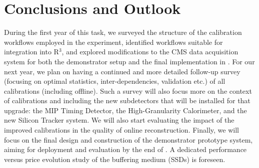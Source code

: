 \chapter{Conclusions and Outlook} \label{sec:conclusions_and_outlook}

During the first year of this task, 
we surveyed the structure of the calibration workflows employed in the experiment, 
identified workflows suitable for integration into R$^3$, 
and explored modifications to the CMS data acquisition system for both the demonstrator setup and the final implementation in \Phasetwo.
For our next year, we plan on having a continued and more detailed follow-up survey (focusing on optimal statistics, inter-dependencies, validation etc.) of all calibrations (including offline). Such a survey will also focus more on the context of \Phasetwo calibrations and including the new subdetectors that will be installed for that upgrade: 
the MIP Timing Detector,
the High-Granularity Calorimeter,
and the new Silicon Tracker system.
We will also start evaluating the impact of the improved calibrations in the quality of online reconstruction.
Finally, we will focus on the final design and construction of the demonstrator prototype system, aiming for deployment and evaluation by the end of \Runthree. A dedicated performance versus price evolution study of the buffering medium (SSDs) is foreseen.